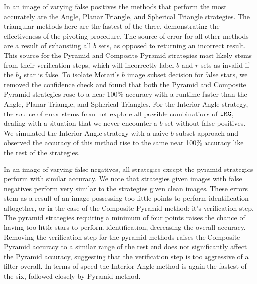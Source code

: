 In an image of varying false positives the methods that perform the most accurately are the Angle, Planar Triangle, and Spherical Triangle strategies.
The triangular methods here are the fastest of the three, demonstrating the effectiveness of the pivoting procedure.
The source of error for all other methods are a result of exhausting all $b$ sets, as opposed to returning an incorrect result.
This source for the Pyramid and Composite Pyramid strategies most likely stems from their verification steps, which will incorrectly label $b$ and $r$ sets as invalid if the $b_4$ star is false.
To isolate Motari's $b$ image subset decision for false stars, we removed the confidence check and found that both the Pyramid and Composite Pyramid strategies rose to a near 100\% accuracy with a runtime faster than the Angle, Planar Triangle, and Spherical Triangles.
For the Interior Angle strategy, the source of error stems from not explore all possible combinations of $\texttt{IMG}$, dealing with a situation that we never encounter a $b$ set without false positives.
We simulated the Interior Angle strategy with a naive $b$ subset approach and observed the accuracy of this method rise to the same near 100\% accuracy like the rest of the strategies.

In an image of varying false negatives, all strategies except the pyramid strategies perform with similar accuracy.
We note that strategies given images with false negatives perform very similar to the strategies given clean images.
These errors stem as a result of an image possessing too little points to perform identification altogether, or in the case of the Composite Pyramid method: it's verification step.
The pyramid strategies requiring a minimum of four points raises the chance of having too little stars to perform identification, decreasing the overall accuracy.
Removing the verification step for the pyramid methods raises the Composite Pyramid accuracy to a similar range of the rest and does not significantly affect the Pyramid accuracy, suggesting that the verification step is too aggressive of a filter overall.
In terms of speed the Interior Angle method is again the fastest of the six, followed closely by Pyramid method.

